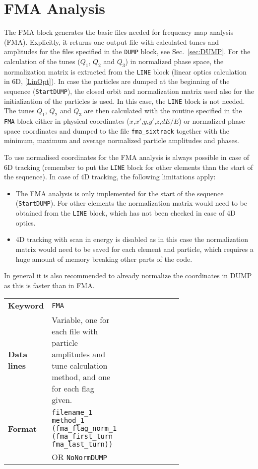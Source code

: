 \section{FMA Analysis} \label{sec:FMA}

The FMA block generates the basic files needed for frequency map analysis (FMA).
Explicitly, it returns one output file with calculated tunes and amplitudes for the files specified in the \texttt{DUMP} block, see Sec.~\ref{sec:DUMP}.
For the calculation of the tunes ($Q_1$, $Q_2$ and $Q_3$) in normalized phase space, the normalization matrix is extracted from the \texttt{LINE} block (linear optics calculation in 6D, \ref{LinOpt}).
In case the particles are dumped at the beginning of the sequence (\texttt{StartDUMP}), the closed orbit and normalization matrix used also for the initialization of the particles is used.
In this case, the \texttt{LINE} block is not needed.
The tunes $Q_1$, $Q_2$ and $Q_3$ are then calculated with the routine specified in the \texttt{FMA} block either in physical coordinates ($x$,$x'$,$y$,$y'$,$z$,$dE/E$) or normalized phase space coordinates and dumped to the file \texttt{fma\_sixtrack} together with the minimum, maximum and average normalized particle amplitudes and phases.

To use normalised coordinates for the FMA analysis is always possible in case of 6D tracking (remember to put the \texttt{LINE} block for other elements than the start of the sequence). In case of 4D tracking, the following limitations apply:
\begin{itemize}
    \item The FMA analysis is only implemented for the start of the sequence (\texttt{StartDUMP}). For other elements the normalization matrix would need to be obtained from the \texttt{LINE} block, which has not been checked in case of 4D optics.
    \item 4D tracking with scan in energy is disabled as in this case the normalization matrix would need to be saved for each element and particle, which requires a huge amount of memory breaking other parts of the code.
\end{itemize}
In general it is also recommended to already normalize the coordinates in DUMP as this is faster than in FMA.

\bigskip
\begin{tabular}{@{}llp{0.7\linewidth}}
    \textbf{Keyword}    & \texttt{FMA} \\
    \textbf{Data lines} & Variable, one for each file with particle amplitudes and tune calculation method, and one for each flag given. \\
    \textbf{Format}     & \texttt{filename\_1 method\_1 (fma\_flag\_norm\_1 (fma\_first\_turn fma\_last\_turn))}\\
                        & OR \texttt{NoNormDUMP}\\
\end{tabular}

